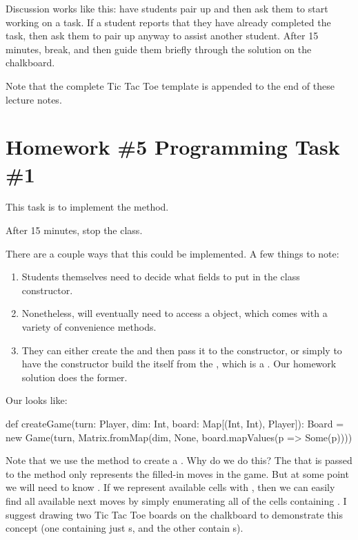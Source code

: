 \documentclass[9pt]{extbook}
\begin{document}
Discussion works like this: have students pair up and then ask them to start working on a task.  If a student reports that they have already completed the task, then ask them to pair up anyway to assist another student.  After 15 minutes, break, and then guide them briefly through the solution on the chalkboard.

Note that the complete Tic Tac Toe template is appended to the end of these lecture notes.

\section{Homework \#5 Programming Task \#1}

This task is to implement the  method.

After 15 minutes, stop the class.

There are a couple ways that this could be implemented.  A few things to note:

\begin{enumerate}
  \item Students themselves need to decide what fields to put in the  class constructor.
  \item Nonetheless,  will eventually need to access a  object, which comes with a variety of convenience methods.
  \item They can either create the  and then pass it to the  constructor, or simply to have the  constructor build the  itself from the , which is a .  Our homework solution does the former.
\end{enumerate}

Our  looks like:

\begin{scalacode}
  def createGame(turn: Player, dim: Int, board: Map[(Int, Int), Player]): Board = {
      new Game(turn, Matrix.fromMap(dim, None, board.mapValues(p => Some(p))))
  }
\end{scalacode}

Note that we use the  method to create a .  Why do we do this?  The  that is passed to the  method only represents the filled-in moves in the game.  But at some point we will need to know .  If we represent available cells with , then we can easily find all available next moves by simply enumerating all of the cells containing .  I suggest drawing two Tic Tac Toe boards on the chalkboard to demonstrate this concept (one containing just s, and the other contain s).
\end{document}
